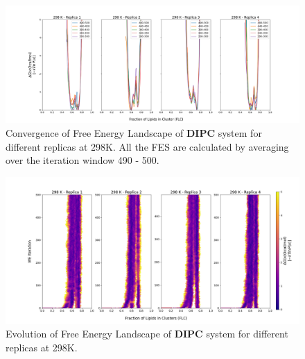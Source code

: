 \documentclass{biophys-new}
\begin{document}
\begin{figure}[hbt!]
\centering
\includegraphics[width=1.1\linewidth]{all_plots/ClusterLipids2Total/DPPC_DIPC_CHOL/298K/Convergence_DIPC_298_ClusterLipids2Total.png}
\caption{Convergence of Free Energy Landscape of \textbf{DIPC} system for different replicas at 298K. All the FES are calculated by averaging over the iteration window 490 - 500.}
\label{fig:view}

\end{figure}

\begin{figure}[hbt!]
\centering
\includegraphics[width=1.1\linewidth]{all_plots/ClusterLipids2Total/DPPC_DIPC_CHOL/298K/Evolution_DIPC_298_ClusterLipids2Total.png}
\caption{Evolution of Free Energy Landscape of \textbf{DIPC} system for different replicas at 298K.}
\label{fig:view}

\end{figure}
\end{document}
